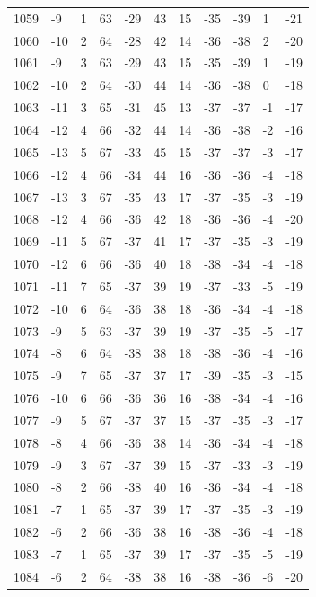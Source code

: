 \begin{table}[H]
\begin{tabular}{lllllllllll}
1059 & -9 & 1 & 63 & -29 & 43 & 15 & -35 & -39 & 1 & -21 \\
1060 & -10 & 2 & 64 & -28 & 42 & 14 & -36 & -38 & 2 & -20 \\
1061 & -9 & 3 & 63 & -29 & 43 & 15 & -35 & -39 & 1 & -19 \\
1062 & -10 & 2 & 64 & -30 & 44 & 14 & -36 & -38 & 0 & -18 \\
1063 & -11 & 3 & 65 & -31 & 45 & 13 & -37 & -37 & -1 & -17 \\
1064 & -12 & 4 & 66 & -32 & 44 & 14 & -36 & -38 & -2 & -16 \\
1065 & -13 & 5 & 67 & -33 & 45 & 15 & -37 & -37 & -3 & -17 \\
1066 & -12 & 4 & 66 & -34 & 44 & 16 & -36 & -36 & -4 & -18 \\
1067 & -13 & 3 & 67 & -35 & 43 & 17 & -37 & -35 & -3 & -19 \\
1068 & -12 & 4 & 66 & -36 & 42 & 18 & -36 & -36 & -4 & -20 \\
1069 & -11 & 5 & 67 & -37 & 41 & 17 & -37 & -35 & -3 & -19 \\
1070 & -12 & 6 & 66 & -36 & 40 & 18 & -38 & -34 & -4 & -18 \\
1071 & -11 & 7 & 65 & -37 & 39 & 19 & -37 & -33 & -5 & -19 \\
1072 & -10 & 6 & 64 & -36 & 38 & 18 & -36 & -34 & -4 & -18 \\
1073 & -9 & 5 & 63 & -37 & 39 & 19 & -37 & -35 & -5 & -17 \\
1074 & -8 & 6 & 64 & -38 & 38 & 18 & -38 & -36 & -4 & -16 \\
1075 & -9 & 7 & 65 & -37 & 37 & 17 & -39 & -35 & -3 & -15 \\
1076 & -10 & 6 & 66 & -36 & 36 & 16 & -38 & -34 & -4 & -16 \\
1077 & -9 & 5 & 67 & -37 & 37 & 15 & -37 & -35 & -3 & -17 \\
1078 & -8 & 4 & 66 & -36 & 38 & 14 & -36 & -34 & -4 & -18 \\
1079 & -9 & 3 & 67 & -37 & 39 & 15 & -37 & -33 & -3 & -19 \\
1080 & -8 & 2 & 66 & -38 & 40 & 16 & -36 & -34 & -4 & -18 \\
1081 & -7 & 1 & 65 & -37 & 39 & 17 & -37 & -35 & -3 & -19 \\
1082 & -6 & 2 & 66 & -36 & 38 & 16 & -38 & -36 & -4 & -18 \\
1083 & -7 & 1 & 65 & -37 & 39 & 17 & -37 & -35 & -5 & -19 \\
1084 & -6 & 2 & 64 & -38 & 38 & 16 & -38 & -36 & -6 & -20 \\

\end{tabular}
\end{table}
